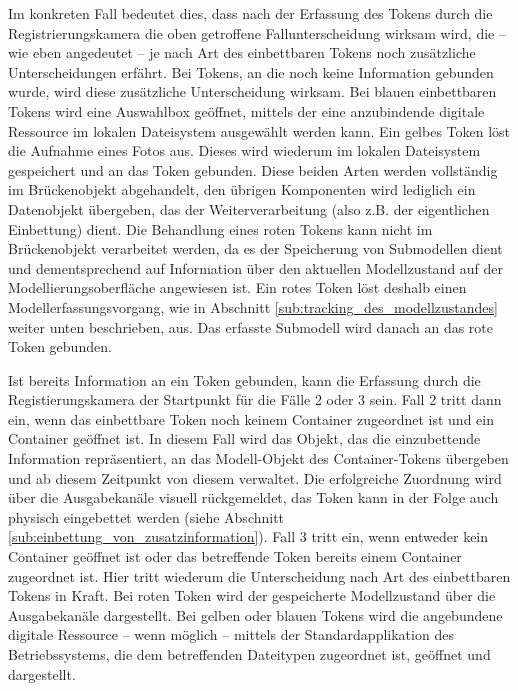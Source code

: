 Im konkreten Fall bedeutet dies, dass nach der Erfassung des Tokens durch die Registrierungskamera die oben getroffene Fallunterscheidung wirksam wird, die -- wie eben angedeutet -- je nach Art des einbettbaren Tokens noch zusätzliche Unterscheidungen erfährt. Bei Tokens, an die noch keine Information gebunden wurde, wird diese zusätzliche Unterscheidung wirksam. Bei blauen einbettbaren Tokens wird eine Auswahlbox geöffnet, mittels der eine anzubindende digitale Ressource im lokalen Dateisystem ausgewählt werden kann. Ein gelbes Token löst die Aufnahme eines Fotos aus. Dieses wird wiederum im lokalen Dateisystem gespeichert und an das Token gebunden. Diese beiden Arten werden vollständig im Brückenobjekt abgehandelt, den übrigen Komponenten wird lediglich ein Datenobjekt übergeben, das der Weiterverarbeitung (also z.B. der eigentlichen Einbettung) dient. Die Behandlung eines roten Tokens kann nicht im Brückenobjekt verarbeitet werden, da es der Speicherung von Submodellen dient und dementsprechend auf Information über den aktuellen Modellzustand auf der Modellierungsoberfläche angewiesen ist. Ein rotes Token löst deshalb einen Modellerfassungsvorgang, wie in Abschnitt \ref{sub:tracking_des_modellzustandes} weiter unten beschrieben, aus. Das erfasste Submodell wird danach an das rote Token gebunden.

Ist bereits Information an ein Token gebunden, kann die Erfassung durch die Registierungskamera der Startpunkt für die Fälle 2 oder 3 sein. Fall 2 tritt dann ein, wenn das einbettbare Token noch keinem Container zugeordnet ist und ein Container geöffnet ist. In diesem Fall wird das Objekt, das die einzubettende Information repräsentiert, an das Modell-Objekt des Container-Tokens übergeben und ab diesem Zeitpunkt von diesem verwaltet. Die erfolgreiche Zuordnung wird über die Ausgabekanäle visuell rückgemeldet, das Token kann in der Folge auch physisch eingebettet werden (siehe Abschnitt \ref{sub:einbettung_von_zusatzinformation}). Fall 3 tritt ein, wenn entweder kein Container geöffnet ist oder das betreffende Token bereits einem Container zugeordnet ist. Hier tritt wiederum die Unterscheidung nach Art des einbettbaren Tokens in Kraft. Bei roten Token wird der gespeicherte Modellzustand über die Ausgabekanäle dargestellt. Bei gelben oder blauen Tokens wird die angebundene digitale Ressource -- wenn möglich -- mittels der Standardapplikation des Betriebssystems, die dem betreffenden Dateitypen zugeordnet ist, geöffnet und dargestellt.


